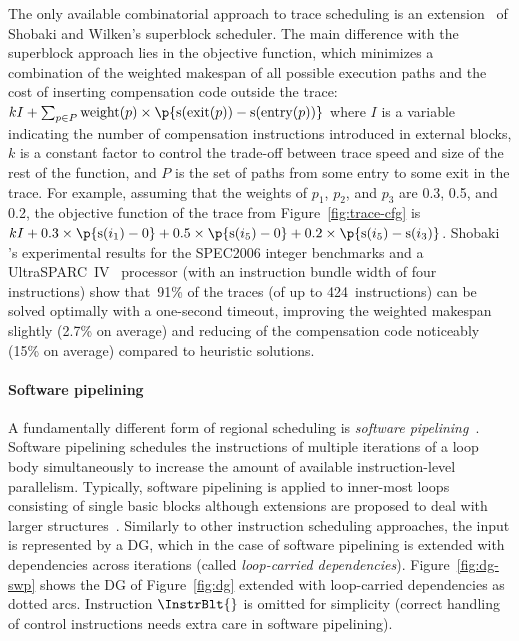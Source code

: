 \documentclass[acmsmall,authorversion,nonacm]{acmart}
\newcommand{\noMathVar}[2]{\operatorname{#1}(#2)}
\newcommand{\textSummation}[2]{\textstyle\sum_{#1}#2}
\newcommand{\exitWeightSymbol}{\operatorname{weight}}
\newcommand{\exitWeight}[1]{\exitWeightSymbol(#1)}
\newcommand{\exitInstructionSymbol}{\operatorname{exit}}
\newcommand{\exitInstruction}[1]{\exitInstructionSymbol(#1)}
\newcommand{\entryInstructionSymbol}{\operatorname{entry}}
\newcommand{\entryInstruction}[1]{\entryInstructionSymbol(#1)}
\begin{document}
The only available combinatorial approach to trace scheduling is an
extension~\cite{Shobaki2009} of Shobaki and Wilken's superblock
scheduler.
The main difference with the superblock approach lies in the objective
function, which minimizes a combination of the weighted makespan of
all possible execution paths and the cost of inserting compensation
code outside the trace:
$k I + \textSummation{p \in P}{\exitWeight{p} \times \p{\noMathVar{s}{\exitInstruction{p}} - \noMathVar{s}{\entryInstruction{p}}}}$
where $I$ is a variable indicating the number of compensation
instructions introduced in external blocks, $k$ is a constant factor
to control the trade-off between trace speed and size of the rest of
the function, and $P$ is the set of paths from some entry to some exit
in the trace.
For example, assuming that the weights of $p_1$, $p_2$, and $p_3$ are
0.3, 0.5, and 0.2, the objective function of the trace from
Figure~\ref{fig:trace-cfg} is $k I + 0.3 \times \p{\noMathVar{s}{i_1}
  - 0} + 0.5 \times \p{\noMathVar{s}{i_5} - 0} + 0.2 \times
\p{\noMathVar{s}{i_5} - \noMathVar{s}{i_3}}$.
Shobaki \etal{}'s experimental results for the SPEC2006 integer
benchmarks and a UltraSPARC~IV~\cite{Greenley1995} processor (with an
instruction bundle width of four instructions) show that~91\% of the
traces (of up to 424~instructions) can be solved optimally with a
one-second timeout, improving the weighted makespan slightly (2.7\% on
average) and reducing of the compensation code noticeably (15\% on
average) compared to heuristic solutions.

\paragraph{Software pipelining}

A fundamentally different form of regional scheduling is
\emph{software pipelining}~\cite{Rau1981,Lam1988}.
Software pipelining schedules the instructions of multiple iterations
of a loop body simultaneously to increase the amount of available
instruction-level parallelism.
Typically, software pipelining is applied to inner-most loops
consisting of single basic blocks although extensions are proposed to
deal with larger structures~\cite[Section 20.4]{Rong2007}.
Similarly to other instruction scheduling approaches, the input is
represented by a DG, which in the case of software pipelining is
extended with dependencies across iterations (called
\emph{loop-carried dependencies}).
Figure~\ref{fig:dg-swp} shows the DG of Figure~\ref{fig:dg} extended
with loop-carried dependencies as dotted arcs.
Instruction $\InstrBlt{}$ is omitted for simplicity (correct handling
of control instructions needs extra care in software pipelining).
\end{document}
